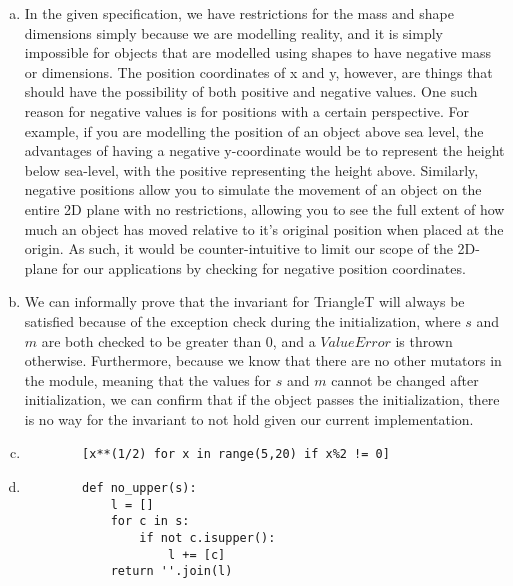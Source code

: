 \documentclass[12pt]{article}
\begin{document}
\begin{enumerate}[a)]
\item In the given specification, we have restrictions for the mass and shape dimensions simply because we are modelling reality, and it is simply impossible for objects that are modelled using shapes to have negative mass or dimensions. The position coordinates of x and y, however, are things that should have the possibility of both positive and negative values. One such reason for negative values is for positions with a certain perspective. For example, if you are modelling the position of an object above sea level, the advantages of having a negative y-coordinate would be to represent the height below sea-level, with the positive representing the height above. Similarly, negative positions allow you to simulate the movement of an object on the entire 2D plane with no restrictions, allowing you to see the full extent of how much an object has moved relative to it's original position when placed at the origin. As such, it would be counter-intuitive to limit our scope of the 2D-plane for our applications by checking for negative position coordinates.
\item We can informally prove that the invariant for TriangleT will always be satisfied because of the exception check during the initialization, where $s$ and $m$ are both checked to be greater than 0, and a $ValueError$ is thrown otherwise. Furthermore, because we know that there are no other mutators in the module, meaning that the values for $s$ and $m$ cannot be changed after initialization, we can confirm that if the object passes the initialization, there is no way for the invariant to not hold given our current implementation.
\item
    \begin{verbatim}
        [x**(1/2) for x in range(5,20) if x%2 != 0]
    \end{verbatim}
\item
    \begin{verbatim}
        def no_upper(s):
            l = []
            for c in s:
                if not c.isupper():
                    l += [c]
            return ''.join(l)
    \end{verbatim}

\end{enumerate}
\end{document}
